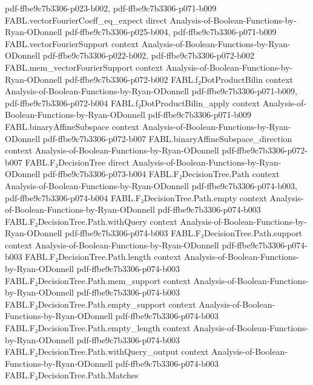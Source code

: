 \begin{theorem}
  {pdf-ffbe9c7b3306-p023-b002,
    pdf-ffbe9c7b3306-p071-b009}
\proofstep
  {FABL.vectorFourierCoeff_eq_expect}
  {direct}
  {Analysis-of-Boolean-Functions-by-Ryan-ODonnell}
  {pdf-ffbe9c7b3306-p025-b004,
    pdf-ffbe9c7b3306-p071-b009}
\proofstep
  {FABL.vectorFourierSupport}
  {context}
  {Analysis-of-Boolean-Functions-by-Ryan-ODonnell}
  {pdf-ffbe9c7b3306-p022-b002,
    pdf-ffbe9c7b3306-p072-b002}
\proofstep
  {FABL.mem_vectorFourierSupport}
  {context}
  {Analysis-of-Boolean-Functions-by-Ryan-ODonnell}
  {pdf-ffbe9c7b3306-p072-b002}
\proofstep
  {FABL.f₂DotProductBilin}
  {context}
  {Analysis-of-Boolean-Functions-by-Ryan-ODonnell}
  {pdf-ffbe9c7b3306-p071-b009,
    pdf-ffbe9c7b3306-p072-b004}
\proofstep
  {FABL.f₂DotProductBilin_apply}
  {context}
  {Analysis-of-Boolean-Functions-by-Ryan-ODonnell}
  {pdf-ffbe9c7b3306-p071-b009}
\proofstep
  {FABL.binaryAffineSubspace}
  {context}
  {Analysis-of-Boolean-Functions-by-Ryan-ODonnell}
  {pdf-ffbe9c7b3306-p072-b007}
\proofstep
  {FABL.binaryAffineSubspace_direction}
  {context}
  {Analysis-of-Boolean-Functions-by-Ryan-ODonnell}
  {pdf-ffbe9c7b3306-p072-b007}
\proofstep
  {FABL.F₂DecisionTree}
  {direct}
  {Analysis-of-Boolean-Functions-by-Ryan-ODonnell}
  {pdf-ffbe9c7b3306-p073-b004}
\proofstep
  {FABL.F₂DecisionTree.Path}
  {context}
  {Analysis-of-Boolean-Functions-by-Ryan-ODonnell}
  {pdf-ffbe9c7b3306-p074-b003,
    pdf-ffbe9c7b3306-p074-b004}
\proofstep
  {FABL.F₂DecisionTree.Path.empty}
  {context}
  {Analysis-of-Boolean-Functions-by-Ryan-ODonnell}
  {pdf-ffbe9c7b3306-p074-b003}
\proofstep
  {FABL.F₂DecisionTree.Path.withQuery}
  {context}
  {Analysis-of-Boolean-Functions-by-Ryan-ODonnell}
  {pdf-ffbe9c7b3306-p074-b003}
\proofstep
  {FABL.F₂DecisionTree.Path.support}
  {context}
  {Analysis-of-Boolean-Functions-by-Ryan-ODonnell}
  {pdf-ffbe9c7b3306-p074-b003}
\proofstep
  {FABL.F₂DecisionTree.Path.length}
  {context}
  {Analysis-of-Boolean-Functions-by-Ryan-ODonnell}
  {pdf-ffbe9c7b3306-p074-b003}
\proofstep
  {FABL.F₂DecisionTree.Path.mem_support}
  {context}
  {Analysis-of-Boolean-Functions-by-Ryan-ODonnell}
  {pdf-ffbe9c7b3306-p074-b003}
\proofstep
  {FABL.F₂DecisionTree.Path.empty_support}
  {context}
  {Analysis-of-Boolean-Functions-by-Ryan-ODonnell}
  {pdf-ffbe9c7b3306-p074-b003}
\proofstep
  {FABL.F₂DecisionTree.Path.empty_length}
  {context}
  {Analysis-of-Boolean-Functions-by-Ryan-ODonnell}
  {pdf-ffbe9c7b3306-p074-b003}
\proofstep
  {FABL.F₂DecisionTree.Path.withQuery_output}
  {context}
  {Analysis-of-Boolean-Functions-by-Ryan-ODonnell}
  {pdf-ffbe9c7b3306-p074-b003}
\proofstep
  {FABL.F₂DecisionTree.Path.Matches}

\end{theorem}
